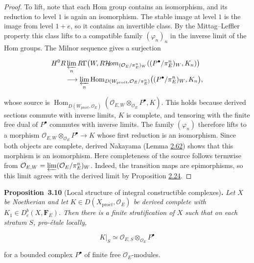\documentclass[11pt]{article}
\newenvironment{bpstatement}[2]{\par\addvspace{0.6\baselineskip}\noindent\textbf{#1}#2\textbf{.}\enspace\ignorespaces}
  {\par\addvspace{0.4\baselineskip}}
\newenvironment{bpstatementit}[2]{\begin{bpstatement}{#1}{#2}\itshape\ignorespaces}{\end{bpstatement}}
\providecommand{\Dbc}{}\renewcommand{\Dbc}{D^b_c}
\providecommand{\Hom}{}\renewcommand{\Hom}{\operatorname{Hom}}
\providecommand{\cHom}{}\renewcommand{\cHom}{R\mathcal{H}\!om}
\begin{document}
\begin{proof}[{Proof}]
To lift, note that each Hom group contains an isomorphism, and its reduction to level \(1\) is again an isomorphism. The stable image at level \(1\) is the image from level \(1+e\), so it contains an invertible class. By the Mittag–Leffler property this class lifts to a compatible family \((\varphi_n)_n\) in the inverse limit of the Hom groups. The Milnor sequence gives a surjection

\[
\begin{aligned}
&H^0R\varprojlim_n R\Gamma\bigl(W,\cHom_{(\mathcal O_E/\pi_E^n)_W}
((P^\bullet/\pi_E^n)_W,K_n)\bigr)\\
&\qquad\longrightarrow
\varprojlim_n\Hom_{D(W_{\mathrm{pro}\acute{e}t},\mathcal O_E/\pi_E^n)}
\bigl((P^\bullet/\pi_E^n)_W,K_n\bigr),
\end{aligned}
\]

whose source is \(\Hom_{D(W_{\mathrm{pro}\acute{e}t},\mathcal O_E)}(\mathcal O_{E,W}\otimes_{\mathcal O_E}P^\bullet,K)\). This holds because derived sections commute with inverse limits, \(K\) is complete, and tensoring with the finite free dual of \(P^\bullet\) commutes with inverse limits. The family \((\varphi_n)\) therefore lifts to a morphism \(\mathcal O_{E,W}\otimes_{\mathcal O_E}P^\bullet\to K\) whose first reduction is an isomorphism. Since both objects are complete, derived Nakayama (Lemma \hyperref[bp190]{2.62}) shows that this morphism is an isomorphism. Here completeness of the source follows termwise from \(\mathcal O_{E,W}=\varprojlim(\mathcal O_E/\pi_E^n)_W\). Indeed, the transition maps are epimorphisms, so this limit agrees with the derived limit by Proposition \hyperref[bp71]{2.24}.
\end{proof}

\label{bp223}%
\begin{bpstatementit}{Proposition~3.10}{ (Local structure of integral constructible complexes)}
Let \(X\) be Noetherian and let \(K\in D(X_{\mathrm{pro}\acute{e}t},\mathcal O_E)\) be derived complete with \(K_1\in\Dbc(X,\mathbf F_E)\). Then there is a finite stratification of \(X\) such that on each stratum \(S\), pro-étale locally,

\[
K|_S\simeq \mathcal O_{E,S}\otimes_{\mathcal O_E}P^\bullet
\]

for a bounded complex \(P^\bullet\) of finite free \(\mathcal O_E\)-modules.
\end{bpstatementit}
\end{document}
